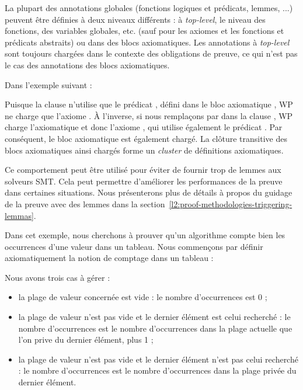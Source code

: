 

La plupart des annotations globales (fonctions logiques et prédicats, lemmes, ...)
peuvent être définies à deux niveaux différents : à \textit{top-level}, le niveau
des fonctions, des variables globales, etc. (sauf pour les axiomes et les
fonctions et prédicats abstraits) ou dans des blocs axiomatiques. Les
annotations à \textit{top-level} sont toujours chargées dans le contexte des
obligations de preuve, ce qui n'est pas le cas des annotations des blocs
axiomatiques.


Dans l'exemple suivant :




Puisque la clause  n'utilise que le prédicat ,
défini dans le bloc axiomatique , WP ne charge que
l'axiome . À l'inverse, si nous remplaçons  par
 dans la clause , WP charge l'axiomatique
 et donc l'axiome , qui utilise également le
prédicat . Par conséquent, le bloc axiomatique  est
également chargé. La clôture transitive des blocs axiomatiques ainsi chargés
forme un \textit{cluster} de définitions axiomatiques.


Ce comportement peut être utilisé pour éviter de fournir trop de lemmes aux
solveurs SMT. Cela peut permettre d'améliorer les performances de la preuve
dans certaines situations. Nous présenterons plus de détails à propos du guidage
de la preuve avec des lemmes dans la
section~\ref{l2:proof-methodologies-triggering-lemmas}.




Dans cet exemple, nous cherchons à prouver qu'un algorithme compte bien les
occurrences d'une valeur dans un tableau. Nous commençons par définir
axiomatiquement la notion de comptage dans un tableau :





Nous avons trois cas à gérer :
\begin{itemize}
\item la plage de valeur concernée est vide : le nombre d'occurrences est 0 ;
\item la plage de valeur n'est pas vide et le dernier élément est celui recherché :
le nombre d'occurrences est le nombre d'occurrences dans la plage actuelle que
l'on prive du dernier élément, plus 1 ;
\item la plage de valeur n'est pas vide et le dernier élément n'est pas celui
recherché : le nombre d'occurrences est le nombre d'occurrences dans la plage
privée du dernier élément.
\end{itemize}


